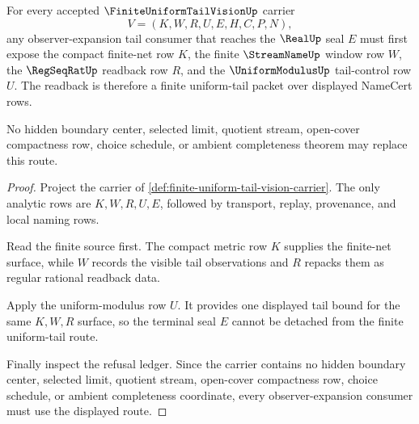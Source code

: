 \begin{theorem}
\label{thm:finite-uniform-tail-vision-readback}
For every accepted $\FiniteUniformTailVisionUp$ carrier
$$
V=(K,W,R,U,E,H,C,P,N),
$$
any observer-expansion tail consumer that reaches the $\RealUp$ seal $E$ must first expose the compact finite-net row $K$, the finite $\StreamNameUp$ window row $W$, the $\RegSeqRatUp$ readback row $R$, and the $\UniformModulusUp$ tail-control row $U$. The readback is therefore a finite uniform-tail packet over displayed NameCert rows.

No hidden boundary center, selected limit, quotient stream, open-cover compactness row, choice schedule, or ambient completeness theorem may replace this route.
\end{theorem}
\begin{proof}
Project the carrier of \autoref{def:finite-uniform-tail-vision-carrier}. The only analytic rows are $K,W,R,U,E$, followed by transport, replay, provenance, and local naming rows.

Read the finite source first. The compact metric row $K$ supplies the finite-net surface, while $W$ records the visible tail observations and $R$ repacks them as regular rational readback data.

Apply the uniform-modulus row $U$. It provides one displayed tail bound for the same $K,W,R$ surface, so the terminal seal $E$ cannot be detached from the finite uniform-tail route.

Finally inspect the refusal ledger. Since the carrier contains no hidden boundary center, selected limit, quotient stream, open-cover compactness row, choice schedule, or ambient completeness coordinate, every observer-expansion consumer must use the displayed route.
\end{proof}




